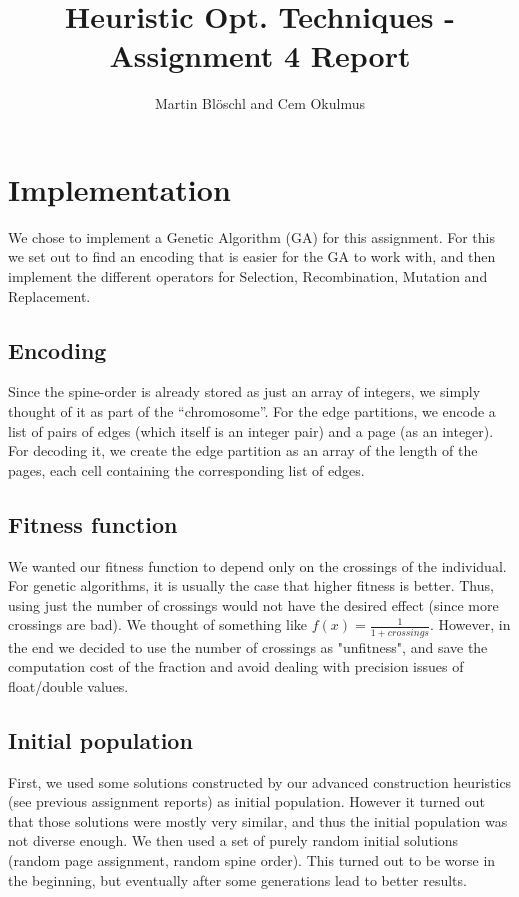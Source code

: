 \documentclass [11pt]{article}
\begin{document}
\title{ Heuristic Opt. Techniques - Assignment 4 Report}
\author{ Martin Blöschl and Cem Okulmus }

\maketitle
\thispagestyle{empty}


\section{Implementation}
We chose to implement a Genetic Algorithm (GA) for this assignment. For this we set out to find an encoding that is easier for the GA to work with, and then implement the different operators for Selection, Recombination, Mutation and Replacement. 

\subsection{Encoding}

Since the spine-order is already stored as just an array of integers, we simply thought of it as part of the ``chromosome''. For the edge partitions, we encode a list of pairs of edges (which itself is an integer pair) and a page (as an integer). For decoding it, we create the edge partition as an array of the length of the pages, each cell containing the corresponding list of edges. 

\subsection{Fitness function}

We wanted our fitness function to depend only on the crossings of the individual. For genetic algorithms, it is usually the case that higher fitness is better. Thus, using just the number of crossings would not have the desired effect (since more crossings are bad). We thought of something like $ f(x) = \frac{1}{1 + crossings} $. However, in the end we decided to use the number of crossings as "unfitness", and save the computation cost of the fraction and avoid dealing with precision issues of float/double values.  

\subsection{Initial population}

First, we used some solutions constructed by our advanced construction heuristics (see previous assignment reports) as initial population. However it turned out that those solutions were mostly very similar, and thus the initial population was not diverse enough. We then used a set of purely random initial solutions (random page assignment, random spine order). This turned out to be worse in the beginning, but eventually after some generations lead to better results.
\end{document}
